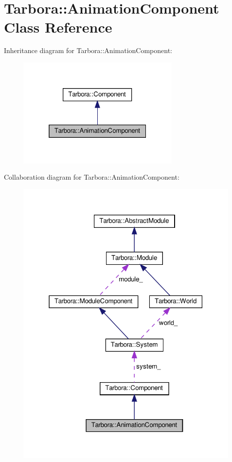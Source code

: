 \hypertarget{classTarbora_1_1AnimationComponent}{}\section{Tarbora\+:\+:Animation\+Component Class Reference}
\label{classTarbora_1_1AnimationComponent}


Inheritance diagram for Tarbora\+:\+:Animation\+Component\+:
\nopagebreak
\begin{figure}[H]
\begin{center}
\leavevmode
\includegraphics[width=229pt]{classTarbora_1_1AnimationComponent__inherit__graph}
\end{center}
\end{figure}


Collaboration diagram for Tarbora\+:\+:Animation\+Component\+:
\nopagebreak
\begin{figure}[H]
\begin{center}
\leavevmode
\includegraphics[width=316pt]{classTarbora_1_1AnimationComponent__coll__graph}
\end{center}
\end{figure}

